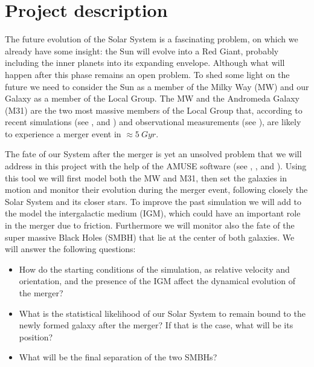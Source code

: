 \documentclass[10pt,english]{article}
\begin{document}
\section{Project description}
\label{project}
The future evolution of the Solar System is a fascinating problem, on which we already have some insight: the Sun will evolve into a Red Giant, probably including the inner planets into its expanding envelope. Although what will happen after this phase remains an open problem. To shed some light on the future we need to consider the Sun as a member of the Milky Way (MW) and our Galaxy as a member of the Local Group. The MW and the Andromeda Galaxy (M31) are the two most massive members of the Local Group that, according to recent simulations (see \textcite{Cox_2008}, \textcite{van_der_Marel_2019} and \textcite{Schiavi_2019}) and observational measurements (see \textcite{van_der_Marel_2012b}), are likely to experience a merger event in \(\approx 5\: Gyr\).\par
\smallskip
The fate of our System after the merger is yet an unsolved problem that we will address in this project with the help of the AMUSE software (see \textcite{Portegies_Zwart_McMillan_2018}, \textcite{Portegies_Zwart_2013}, \textcite{Pelupessy_2013} and \textcite{Portegies_Zwart_2009}). Using this tool we will first model both the MW and M31, then set the galaxies in motion and monitor their evolution during the merger event, following closely the Solar System and its closer stars. To improve the past simulation we will add to the model the intergalactic medium (IGM), which could have an important role in the merger due to friction. Furthermore we will monitor also the fate of the super massive Black Holes (SMBH) that lie at the center of both galaxies. We will answer the following questions:
\begin{itemize}
    \item How do the starting conditions of the simulation, as relative velocity and orientation, and the presence of the IGM affect the dynamical evolution of the merger?
    \item What is the statistical likelihood of our Solar System to remain bound to the newly formed galaxy after the merger? If that is the case, what will be its position?
    \item What will be the final separation of the two SMBHs?
\end{itemize}
\par
\smallskip
\end{document}
